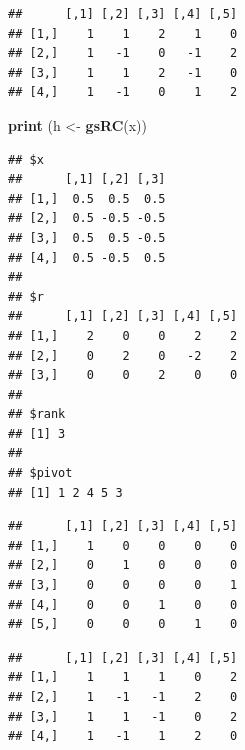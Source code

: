 \documentclass[12pt,]{article}
\newenvironment{Shaded}{\begin{snugshade}}{\end{snugshade}}
\newcommand{\KeywordTok}[1]{\textcolor[rgb]{0.13,0.29,0.53}{\textbf{#1}}}
\newcommand{\DecValTok}[1]{\textcolor[rgb]{0.00,0.00,0.81}{#1}}
\newcommand{\StringTok}[1]{\textcolor[rgb]{0.31,0.60,0.02}{#1}}
\newcommand{\OperatorTok}[1]{\textcolor[rgb]{0.81,0.36,0.00}{\textbf{#1}}}
\newcommand{\NormalTok}[1]{#1}
\begin{document}
\begin{verbatim}
##      [,1] [,2] [,3] [,4] [,5]
## [1,]    1    1    2    1    0
## [2,]    1   -1    0   -1    2
## [3,]    1    1    2   -1    0
## [4,]    1   -1    0    1    2
\end{verbatim}

\begin{Shaded}
\begin{Highlighting}[]
\KeywordTok{print}\NormalTok{ (h <-}\StringTok{ }\KeywordTok{gsRC}\NormalTok{(x))}
\end{Highlighting}
\end{Shaded}

\begin{verbatim}
## $x
##      [,1] [,2] [,3]
## [1,]  0.5  0.5  0.5
## [2,]  0.5 -0.5 -0.5
## [3,]  0.5  0.5 -0.5
## [4,]  0.5 -0.5  0.5
## 
## $r
##      [,1] [,2] [,3] [,4] [,5]
## [1,]    2    0    0    2    2
## [2,]    0    2    0   -2    2
## [3,]    0    0    2    0    0
## 
## $rank
## [1] 3
## 
## $pivot
## [1] 1 2 4 5 3
\end{verbatim}

\begin{Shaded}
\end{Shaded}

\begin{verbatim}
##      [,1] [,2] [,3] [,4] [,5]
## [1,]    1    0    0    0    0
## [2,]    0    1    0    0    0
## [3,]    0    0    0    0    1
## [4,]    0    0    1    0    0
## [5,]    0    0    0    1    0
\end{verbatim}

\begin{Shaded}
\end{Shaded}

\begin{verbatim}
##      [,1] [,2] [,3] [,4] [,5]
## [1,]    1    1    1    0    2
## [2,]    1   -1   -1    2    0
## [3,]    1    1   -1    0    2
## [4,]    1   -1    1    2    0
\end{verbatim}
\end{document}
